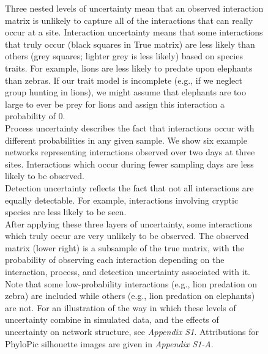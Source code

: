 \documentclass[12pt]{article}
\begin{document}
  \begin{figure}[h!]
    \caption{Three nested levels of uncertainty mean that an observed interaction matrix is unlikely to capture all of the interactions that can really occur at a site. Interaction uncertainty means that some interactions that truly occur (black squares in True matrix) are less likely than others (grey squares; lighter grey is less likely) based on species traits. For example, lions are less likely to predate upon elephants than zebras. If our trait model is incomplete (e.g., if we neglect group hunting in lions), we might assume that elephants are too large to ever be prey for lions and assign this interaction a probability of 0.\\
    \indent Process uncertainty describes the fact that interactions occur with different probabilities in any given sample. We show six example networks representing interactions observed over two days at three sites. Interactions which occur during fewer sampling days are less likely to be observed.\\
    \indent Detection uncertainty reflects the fact that not all interactions are equally detectable. For example, interactions involving cryptic species are less likely to be seen.\\
    \indent After applying these three layers of uncertainty, some interactions which truly occur are very unlikely to be observed. The observed matrix (lower right) is a subsample of the true matrix, with the probability of observing each interaction depending on the interaction, process, and detection uncertainty associated with it. Note that some low-probability interactions (e.g., lion predation on zebra) are included while others (e.g., lion predation on elephants) are not. For an illustration of the way in which these levels of uncertainty combine in simulated data, and the effects of uncertainty on network structure, see \emph{Appendix S1}. Attributions for PhyloPic silhouette images are given in \emph{Appendix S1-A}.}
    \label{conceptual_fig}
    \begin{center}
    \end{center}
    \end{figure}
\end{document}
